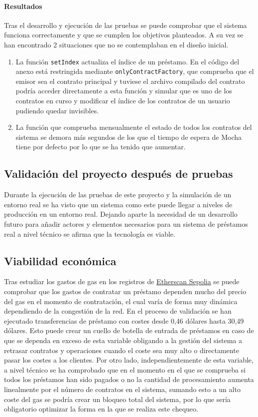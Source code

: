 \paragraph{Resultados} Tras el desarrollo y ejecución de las pruebas se puede comprobar que el sistema funciona correctamente y que se cumplen los objetivos planteados.
    A su vez se han encontrado 2 situaciones que no se contemplaban en el diseño inicial.
\begin{enumerate}
    \item La función \texttt{setIndex} actualiza el índice de un préstamo.
    En el código del anexo está restringida mediante \texttt{onlyContractFactory},
    que comprueba que el emisor sea el contrato principal y tuviese
        el archivo compilado del contrato podría acceder directamente a esta 
        función y simular que es uno de los contratos en curso 
        y modificar el índice de los contratos de un usuario pudiendo quedar 
        invisibles.
        \item La función que comprueba mensualmente el estado de todos los 
        contratos del sistema se demora más segundos de los que el tiempo de espera de Mocha tiene por defecto por lo que se ha tenido que aumentar.
\end{enumerate}

\subsection{Validación del proyecto después de pruebas}
Durante la ejecución de las pruebas de este proyecto y la simulación de un entorno real se ha visto que un sistema como este puede llegar a niveles de producción
en un entorno real. Dejando aparte la necesidad de un desarrollo futuro para
añadir actores y elementos necesarios para un sistema de préstamos real
a nivel técnico se afirma que la tecnología es viable.

\subsection{Viabilidad económica}
Tras estudiar los gastos de \gls{gas} en los registros de 
\href{https://sepolia.etherscan.io/}{Etherscan Sepolia} se puede comprobar 
que los gastos de contratar un préstamo
dependen mucho del precio del \gls{gas} en el momento de contratación, 
el cual varía de forma muy dinámica dependiendo de la congestión de la red.
En el proceso de validación se han ejecutado
 transferencias de préstamo con costes desde 0,46 dólares hasta 30,49 dólares.
 Esto puede crear un cuello de botella de entrada de préstamos en caso de que 
 se dependa en exceso de esta variable obligando 
a la gestión del sistema a retrasar contratos y operaciones cuando el coste 
sea muy alto o directamente pasar los costes a los clientes.
Por otro lado, independientemente de esta variable, a nivel técnico se ha 
comprobado que en el momento en el que se comprueba si todos los préstamos
 han sido pagados o no
la cantidad de procesamiento aumenta linealmente por el número de contratos 
en el sistema, sumando esto a un alto coste del gas se podría crear un bloqueo
total del sistema,
por lo que sería obligatorio optimizar la forma en la que se realiza este 
chequeo.



